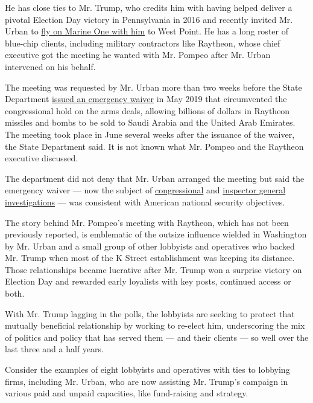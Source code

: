 He has close ties to Mr. Trump, who credits him with having helped
deliver a pivotal Election Day victory in Pennsylvania in 2016 and
recently invited Mr. Urban to
\href{https://twitter.com/rep_stevewomack/status/1271805658275418115}{fly
on Marine One with him} to West Point. He has a long roster of blue-chip
clients, including military contractors like Raytheon, whose chief
executive got the meeting he wanted with Mr. Pompeo after Mr. Urban
intervened on his behalf.

The meeting was requested by Mr. Urban more than two weeks before the
State Department
\href{https://www.nytimes.com/2019/05/23/us/politics/trump-saudi-arabia-arms-sales.html}{issued
an emergency waiver} in May 2019 that circumvented the congressional
hold on the arms deals, allowing billions of dollars in Raytheon
missiles and bombs to be sold to Saudi Arabia and the United Arab
Emirates. The meeting took place in June several weeks after the
issuance of the waiver, the State Department said. It is not known what
Mr. Pompeo and the Raytheon executive discussed.

The department did not deny that Mr. Urban arranged the meeting but said
the emergency waiver --- now the subject of
\href{https://www.nytimes.com/2020/06/25/us/politics/trump-congress-arms-sales.html}{congressional}
and
\href{https://www.nytimes.com/2020/05/18/us/politics/pompeo-trump-linick-inspector-general-firing.html}{inspector
general investigations} --- was consistent with American national
security objectives.

The story behind Mr. Pompeo's meeting with Raytheon, which has not been
previously reported, is emblematic of the outsize influence wielded in
Washington by Mr. Urban and a small group of other lobbyists and
operatives who backed Mr. Trump when most of the K Street establishment
was keeping its distance. Those relationships became lucrative after Mr.
Trump won a surprise victory on Election Day and rewarded early
loyalists with key posts, continued access or both.

With Mr. Trump lagging in the polls, the lobbyists are seeking to
protect that mutually beneficial relationship by working to re-elect
him, underscoring the mix of politics and policy that has served them
--- and their clients --- so well over the last three and a half years.

Consider the examples of eight lobbyists and operatives with ties to
lobbying firms, including Mr. Urban, who are now assisting Mr. Trump's
campaign in various paid and unpaid capacities, like fund-raising and
strategy.

